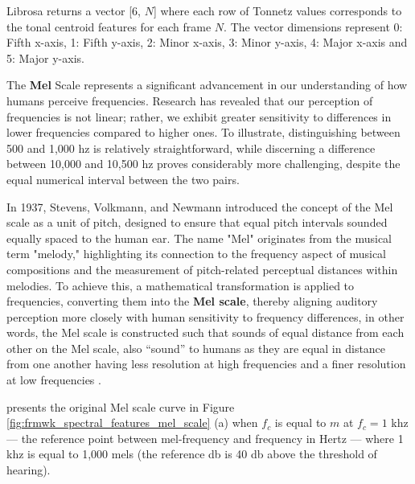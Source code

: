 Librosa returns a vector  [6, $N$] where each row of Tonnetz values corresponds to the tonal centroid features for each frame $N$. The vector dimensions represent 0: Fifth x-axis, 1: Fifth y-axis, 2: Minor x-axis, 3: Minor y-axis, 4: Major x-axis and 5: Major y-axis.


The \textbf{Mel} Scale represents a significant advancement in our understanding of how humans perceive frequencies. Research has revealed that our perception of frequencies is not linear; rather, we exhibit greater sensitivity to differences in lower frequencies compared to higher ones. To illustrate, distinguishing between 500 and 1,000 \gls{hz} is relatively straightforward, while discerning a difference between 10,000 and 10,500 \gls{hz} proves considerably more challenging, despite the equal numerical interval between the two pairs. 

In 1937, Stevens, Volkmann, and Newmann introduced the concept of the Mel scale as a unit of pitch, designed to ensure that equal pitch intervals sounded equally spaced to the human ear. The name "Mel" originates from the musical term "melody," highlighting its connection to the frequency aspect of musical compositions and the measurement of pitch-related perceptual distances within melodies. To achieve this, a mathematical transformation is applied to frequencies, converting them into the \textbf{Mel scale}, thereby aligning auditory perception more closely with human sensitivity to frequency differences, in other words, the Mel scale is constructed such that sounds of equal distance from each other on the Mel scale, also “sound” to humans as they are equal in distance from one another having less resolution at high frequencies and a finer resolution at low frequencies \cite{Moore2013}. 

\textcite{Park2008} presents the original Mel scale curve in Figure \ref{fig:frmwk_spectral_features_mel_scale} (a) when $f_c$ is equal to $m$ at $f_c = 1$ \gls{k}\gls{hz} — the reference point between mel-frequency and frequency in Hertz — where 1 \gls{k}\gls{hz} is equal to 1,000 mels (the reference \gls{db} is 40 \gls{db} above the threshold of hearing). 

